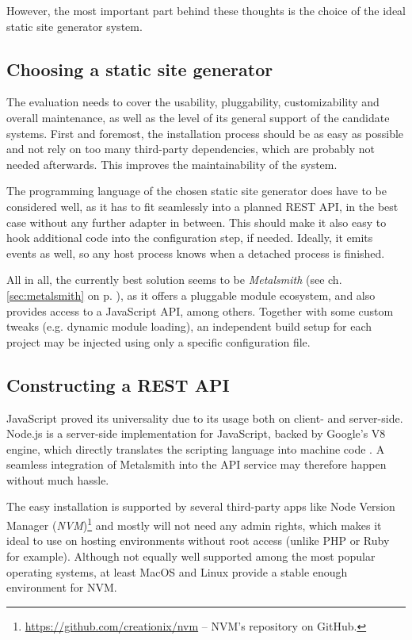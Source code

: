 However, the most important part behind these thoughts is the choice of the ideal static site generator system.


\subsection{Choosing a static site generator}
\label{sec:primarythoughts-generator}

The evaluation needs to cover the usability, pluggability, customizability and overall maintenance, as well as the level of its general support of the candidate systems. First and foremost, the installation process should be as easy as possible and not rely on too many third-party dependencies, which are probably not needed afterwards. This improves the maintainability of the system.

The programming language of the chosen static site generator does have to be considered well, as it has to fit seamlessly into a planned REST API, in the best case without any further adapter in between. This should make it also easy to hook additional code into the configuration step, if needed. Ideally, it emits events as well, so any host process knows when a detached process is finished.

All in all, the currently best solution seems to be \emph{Metalsmith} (see ch. \ref{sec:metalsmith} on p. \pageref{sec:metalsmith}), as it offers a pluggable module ecosystem, and also provides access to a JavaScript API, among others. Together with some custom tweaks (e.g. dynamic module loading), an independent build setup for each project may be injected using only a specific configuration file.


\subsection{Constructing a REST API}
\label{sec:primarythoughts-restapi}

JavaScript proved its universality due to its usage both on client- and server-side. Node.js is a server-side implementation for JavaScript, backed by Google's V8 engine, which directly translates the scripting language into machine code \cite[4]{cantelon2017node}. A seamless integration of Metalsmith into the API service may therefore happen without much hassle.

The easy installation is supported by several third-party apps like Node Version Manager (\emph{NVM})\footnote{\url{https://github.com/creationix/nvm} -- NVM's repository on GitHub.} and mostly will not need any admin rights, which makes it ideal to use on hosting environments without root access (unlike PHP or Ruby for example). Although not equally well supported among the most popular operating systems, at least MacOS and Linux provide a stable enough environment for NVM.

